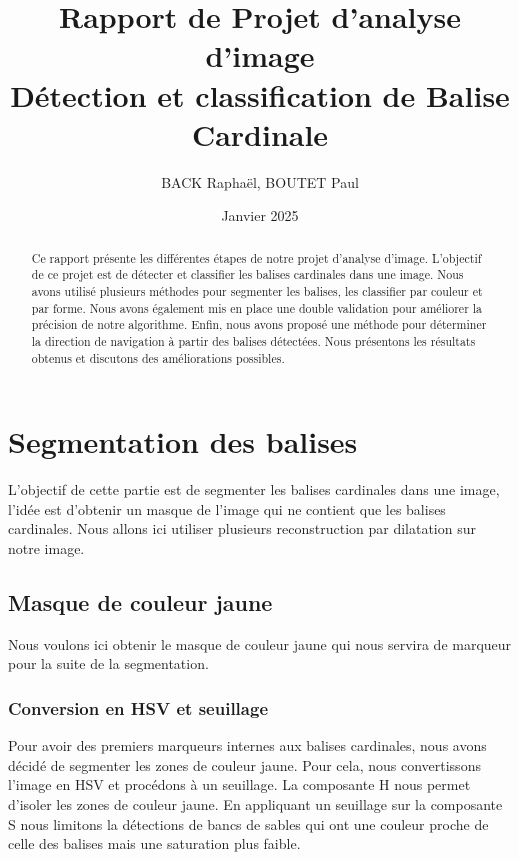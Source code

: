 \documentclass{article}
\title{Rapport de Projet d'analyse d'image\\ Détection et classification de Balise Cardinale}
\author{BACK Raphaël, BOUTET Paul}
\date{Janvier 2025}
\begin{document}
\maketitle

\begin{abstract}
    Ce rapport présente les différentes étapes de notre projet d'analyse d'image. L'objectif de ce projet est de détecter et classifier les balises cardinales dans une image. Nous avons utilisé plusieurs méthodes pour segmenter les balises, les classifier par couleur et par forme. Nous avons également mis en place une double validation pour améliorer la précision de notre algorithme. Enfin, nous avons proposé une méthode pour déterminer la direction de navigation à partir des balises détectées. Nous présentons les résultats obtenus et discutons des améliorations possibles.
\end{abstract}

\setcounter{tocdepth}{2}
\tableofcontents

\newpage

\section{Segmentation des balises}

L'objectif de cette partie est de segmenter les balises cardinales dans une
image, l'idée est d'obtenir un masque de l'image qui ne contient que les
balises cardinales. Nous allons ici utiliser plusieurs reconstruction par
dilatation sur notre image.

\subsection{Masque de couleur jaune}

Nous voulons ici obtenir le masque de couleur jaune qui nous servira de
marqueur pour la suite de la segmentation.

\subsubsection{Conversion en HSV et seuillage}
Pour avoir des premiers marqueurs internes aux balises cardinales, nous avons
décidé de segmenter les zones de couleur jaune. Pour cela, nous convertissons
l'image en HSV et procédons à un seuillage. La composante H nous permet
d'isoler les zones de couleur jaune. En appliquant un seuillage sur la
composante S nous limitons la détections de bancs de sables qui ont une couleur
proche de celle des balises mais une saturation plus faible.
\end{document}
